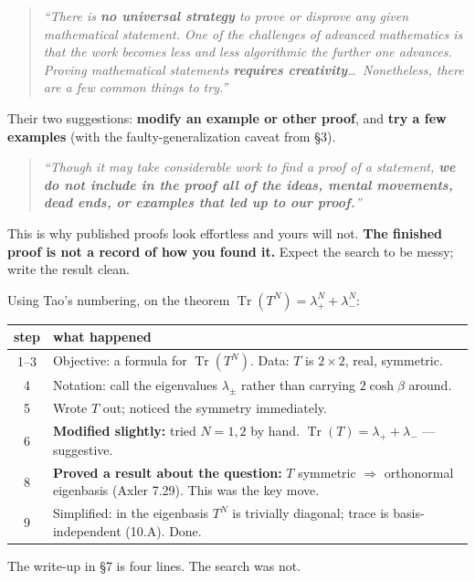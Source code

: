 \begin{bookbox}[title={Diedrichs \& Lovett's honest warning, §2.3.6}]
\begin{quote}\itshape
``There is \textbf{no universal strategy} to prove or disprove any given mathematical statement. One
of the challenges of advanced mathematics is that the work becomes less and less algorithmic the
further one advances. Proving mathematical statements \textbf{requires creativity}\ldots\ Nonetheless,
there are a few common things to try.''
\end{quote}
Their two suggestions: \textbf{modify an example or other proof}, and \textbf{try a few examples}
(with the faulty-generalization caveat from §3).
\end{bookbox}

\begin{techbox}[title={And the part nobody tells beginners --- D\&L §2.3.6}]
\begin{quote}\itshape
``Though it may take considerable work to find a proof of a statement, \textbf{we do not include in
the proof all of the ideas, mental movements, dead ends, or examples that led up to our proof.}''
\end{quote}
This is why published proofs look effortless and yours will not. \textbf{The finished proof is not a
record of how you found it.} Expect the search to be messy; write the result clean.
\end{techbox}

\begin{dobox}[title={Worked: how §9's theorem was actually found}]
Using Tao's numbering, on the theorem $\operatorname{Tr}(T^N)=\lambda_+^N+\lambda_-^N$:
\begin{center}\small
\begin{tabular}{@{}c>{\raggedright\arraybackslash}p{13.4cm}@{}}
\toprule
\rowcolor{nano!12}
\textbf{step} & \textbf{what happened}\\
\midrule
1--3 & Objective: a formula for $\operatorname{Tr}(T^N)$. Data: $T$ is $2\times2$, real, symmetric.\\
4 & Notation: call the eigenvalues $\lambda_\pm$ rather than carrying $2\cosh\beta$ around.\\
5 & Wrote $T$ out; noticed the symmetry immediately.\\
6 & \textbf{Modified slightly:} tried $N=1,2$ by hand. $\operatorname{Tr}(T)=\lambda_++\lambda_-$ --- suggestive.\\
8 & \textbf{Proved a result about the question:} $T$ symmetric $\Rightarrow$ orthonormal eigenbasis (Axler 7.29). This was the key move.\\
9 & Simplified: in the eigenbasis $T^N$ is trivially diagonal; trace is basis-independent (10.A). Done.\\
\bottomrule
\end{tabular}
\end{center}
\vspace{2pt}
The write-up in §7 is four lines. The search was not.
\end{dobox}
